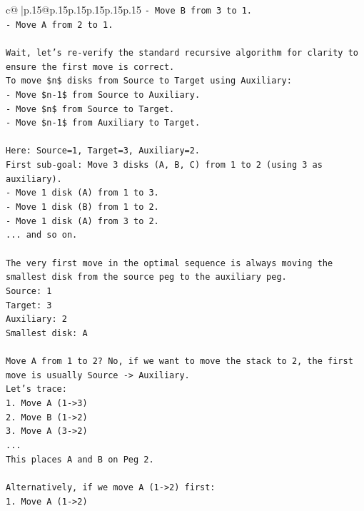 \documentclass{article}
\begin{document}
{\begin{supertabular}{c@{$\;$}|p{.15\linewidth}@{}p{.15\linewidth}p{.15\linewidth}p{.15\linewidth}p{.15\linewidth}p{.15\linewidth}}
{{{\texttt{{-} Move B from 3 to 1.} \\
\texttt{{-} Move A from 2 to 1.} \\
\\ 
\texttt{Wait, let's re{-}verify the standard recursive algorithm for clarity to ensure the first move is correct.} \\
\texttt{To move \$n\$ disks from Source to Target using Auxiliary:} \\
\texttt{{-} Move \$n{-}1\$ from Source to Auxiliary.} \\
\texttt{{-} Move \$n\$ from Source to Target.} \\
\texttt{{-} Move \$n{-}1\$ from Auxiliary to Target.} \\
\\ 
\texttt{Here: Source=1, Target=3, Auxiliary=2.} \\
\texttt{First sub{-}goal: Move 3 disks (A, B, C) from 1 to 2 (using 3 as auxiliary).} \\
\texttt{{-} Move 1 disk (A) from 1 to 3.} \\
\texttt{{-} Move 1 disk (B) from 1 to 2.} \\
\texttt{{-} Move 1 disk (A) from 3 to 2.} \\
\texttt{... and so on.} \\
\\ 
\texttt{The very first move in the optimal sequence is always moving the smallest disk from the source peg to the auxiliary peg.} \\
\texttt{Source: 1} \\
\texttt{Target: 3} \\
\texttt{Auxiliary: 2} \\
\texttt{Smallest disk: A} \\
\\ 
\texttt{Move A from 1 to 2? No, if we want to move the stack to 2, the first move is usually Source {-}> Auxiliary.} \\
\texttt{Let's trace:} \\
\texttt{1. Move A (1{-}>3)} \\
\texttt{2. Move B (1{-}>2)} \\
\texttt{3. Move A (3{-}>2)} \\
\texttt{...} \\
\texttt{This places A and B on Peg 2.} \\
\\ 
\texttt{Alternatively, if we move A (1{-}>2) first:} \\
\texttt{1. Move A (1{-}>2)} \\
}}}
\end{supertabular}}
\end{document}
